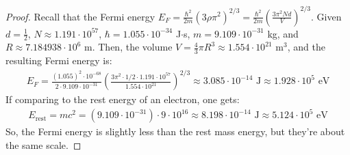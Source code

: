 \documentclass{article}
\begin{document}
\begin{proof}
    \hfil

    \item[(e)] Recall that the Fermi energy $E_F = \frac{\hbar^2}{2m}(3\rho\pi^2)^{2/3} = \frac{\hbar^2}{2m}\left(\frac{3\pi^2 Nd}{V}\right)^{2/3}$. Given $d=\frac{1}{2}$, $N \approx 1.191\cdot 10^{57}$, $\hbar = 1.055\cdot 10^{-34}$ J$\cdot$s, $m=9.109\cdot 10^{-31}$ kg, and $R\approx 7.184938 \cdot 10^6$ m. Then, the volume $V = \frac{4}{3}\pi R^3\approx 1.554\cdot 10^{21}$ m$^3$, and the resulting Fermi energy is:
    \begin{align}
        E_F = \frac{(1.055)^2\cdot 10^{-68}}{2\cdot 9.109\cdot 10^{-31}}\left(\frac{3\pi^2\cdot 1/2\cdot 1.191\cdot 10^{57}}{1.554\cdot 10^{21}}\right)^{2/3}\approx 3.085\cdot 10^{-14}\text{ J} \approx 1.928\cdot 10^5\text{ eV}
    \end{align}
    If comparing to the rest energy of an electron, one gets:
    \begin{align}
        E_\text{rest} = mc^2= (9.109\cdot 10^{-31})\cdot 9\cdot 10^16\approx 8.198\cdot 10^{-14}\text{ J}\approx 5.124\cdot 10^5\text{ eV}
    \end{align}
    So, the Fermi energy is slightly less than the rest mass energy, but they're about the same scale.
\end{proof}
\end{document}
